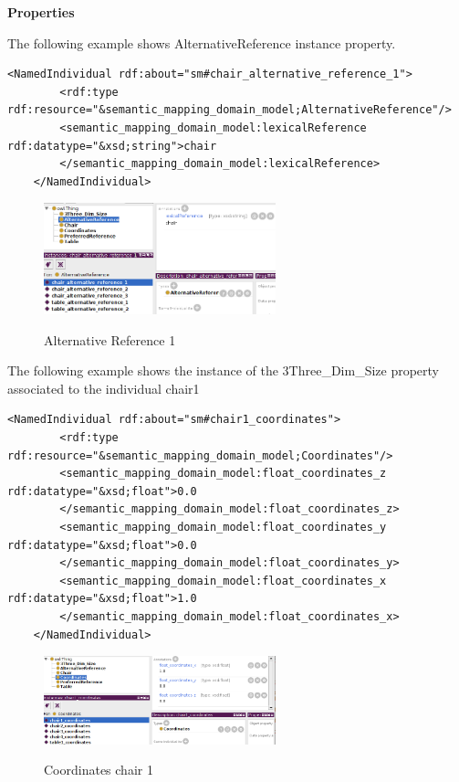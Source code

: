 \textbf{Properties}

The following example shows AlternativeReference instance property.
\begin{lstlisting}    
<NamedIndividual rdf:about="sm#chair_alternative_reference_1">
        <rdf:type rdf:resource="&semantic_mapping_domain_model;AlternativeReference"/>
        <semantic_mapping_domain_model:lexicalReference rdf:datatype="&xsd;string">chair
        </semantic_mapping_domain_model:lexicalReference>
    </NamedIndividual>
\end{lstlisting}


\begin{figure}[H]
\centering
\includegraphics[width=0.6\textwidth]{imgs/refChair1.png}
\label{fig:datatypes}
\caption{Alternative Reference 1}
\end{figure}

The following example shows the instance of the 3Three\_Dim\_Size property associated to the individual chair1
\begin{lstlisting}    
<NamedIndividual rdf:about="sm#chair1_coordinates">
        <rdf:type rdf:resource="&semantic_mapping_domain_model;Coordinates"/>
        <semantic_mapping_domain_model:float_coordinates_z rdf:datatype="&xsd;float">0.0
        </semantic_mapping_domain_model:float_coordinates_z>
        <semantic_mapping_domain_model:float_coordinates_y rdf:datatype="&xsd;float">0.0
        </semantic_mapping_domain_model:float_coordinates_y>
        <semantic_mapping_domain_model:float_coordinates_x rdf:datatype="&xsd;float">1.0
        </semantic_mapping_domain_model:float_coordinates_x>
    </NamedIndividual>
\end{lstlisting}



\begin{figure}[H]
\centering
\includegraphics[width=0.6\textwidth]{imgs/coordchair1.png}
\label{fig:datatypes}
\caption{Coordinates chair 1}
\end{figure}
